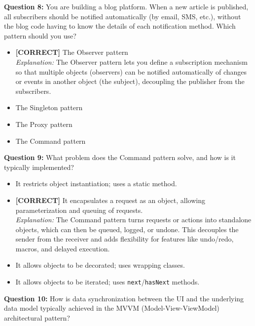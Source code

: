 \vspace{0.3cm}
\noindent
\textbf{Question 8:} You are building a blog platform. When a new article is published, all subscribers should be notified automatically (by email, SMS, etc.), without the blog code having to know the details of each notification method. Which pattern should you use?
\\[0.2cm]
\begin{itemize}
 \item \textbf{[CORRECT]} The Observer pattern
\\[0.1cm]
\textit{Explanation:} 
The Observer pattern lets you define a subscription mechanism so that multiple objects (observers) can be notified automatically of changes or events in another object (the subject), decoupling the publisher from the subscribers.
 \item The Singleton pattern
 \item The Proxy pattern
 \item The Command pattern
\end{itemize}
\vspace{0.3cm}
\noindent
\textbf{Question 9:} What problem does the Command pattern solve, and how is it typically implemented?
\\[0.2cm]
\begin{itemize}
 \item It restricts object instantiation; uses a static method.
 \item \textbf{[CORRECT]} It encapsulates a request as an object, allowing parameterization and queuing of requests.
\\[0.1cm]
\textit{Explanation:} 
The Command pattern turns requests or actions into standalone objects, which can then be queued, logged, or undone. This decouples the sender from the receiver and adds flexibility for features like undo/redo, macros, and delayed execution.
 \item It allows objects to be decorated; uses wrapping classes.
 \item It allows objects to be iterated; uses \texttt{next}/\texttt{hasNext} methods.
\end{itemize}
\vspace{0.3cm}
\noindent
\textbf{Question 10:} How is data synchronization between the UI and the underlying data model typically achieved in the MVVM (Model-View-ViewModel) architectural pattern?
\\[0.2cm]
